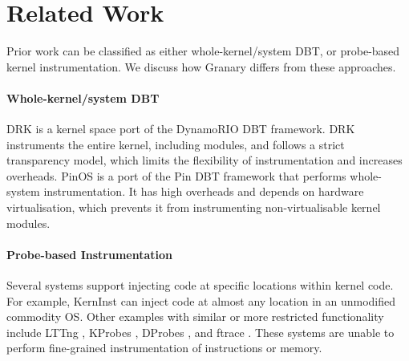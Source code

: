 \documentclass[preprint]{sigplanconf}
\begin{document}
\section{Related Work}\label{sec:related}
Prior work can be classified as either whole-kernel/system DBT, or probe-based kernel instrumentation. We discuss how Granary differs from these approaches.
\vspace{-3pt}\paragraph{Whole-kernel/system DBT} DRK \cite{DRK} is a kernel space port of the DynamoRIO \cite{DynamoRIO} DBT framework. DRK instruments the entire kernel, including modules, and follows a strict transparency model, which limits the flexibility of instrumentation and increases overheads.  PinOS \cite{PinOS} is a port of the Pin \cite{Pin} DBT framework that performs whole-system instrumentation. It has high overheads and depends on hardware virtualisation, which prevents it from instrumenting non-virtualisable kernel modules. 



\vspace{-3pt}\paragraph{Probe-based Instrumentation} Several systems support injecting code at specific locations within kernel code. For example, KernInst \cite{KernInst} can inject code at almost any location in an unmodified commodity OS. Other examples with similar or more restricted functionality include LTTng \cite{LTTng}, KProbes \cite{KProbes}, DProbes \cite{DProbes}, and ftrace \cite{ftrace}. These systems are unable to perform fine-grained instrumentation of instructions or memory.


%
\end{document}
